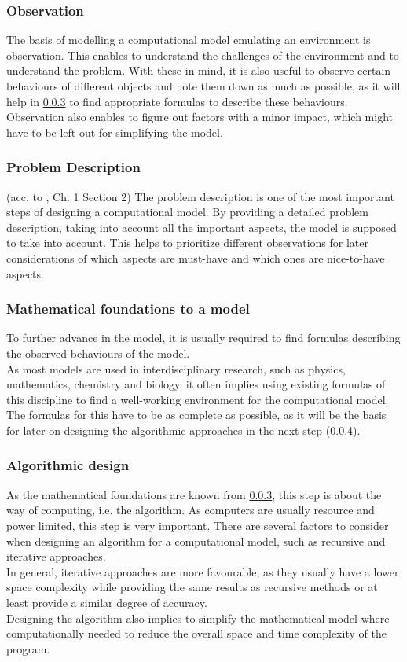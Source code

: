 \documentclass[conference,compsoc]{IEEEtran}
\begin{document}
\subsubsection{Observation}
The basis of modelling a computational model emulating an environment is observation. This enables to understand the challenges of the environment and to understand the problem. With these in mind, it is also useful to observe certain behaviours of different objects and note them down as much as possible, as it will help in \ref{Mathematical-foundations} to find appropriate formulas to describe these behaviours. \\
Observation also enables to figure out factors with a minor impact, which might have to be left out for simplifying the model.
\subsubsection{Problem Description}
(acc. to \cite{ComputationalModelsIntroduction}, Ch. 1 Section 2)
The problem description is one of the most important steps of designing a computational model. By providing a detailed problem description, taking into account all the important aspects, the model is supposed to take into account. This helps to prioritize different observations for later considerations of which aspects are must-have and which ones are nice-to-have aspects. 
\subsubsection{Mathematical foundations to a model}
\label{Mathematical-foundations}
To further advance in the model, it is usually required to find formulas describing the observed behaviours of the model. \\
As most models are used in interdisciplinary research, such as physics, mathematics, chemistry and biology, it often implies using existing formulas of this discipline to find a well-working environment for the computational model. 
The formulas for this have to be as complete as possible, as it will be the basis for later on designing the algorithmic approaches in the next step (\ref{algorithmic-design}).
\subsubsection{Algorithmic design}
\label{algorithmic-design}
As the mathematical foundations are known from \ref{Mathematical-foundations}, this step is about the way of computing, i.e. the algorithm. As computers are usually resource and power limited, this step is very important. There are several factors to consider when designing an algorithm for a computational model, such as recursive and iterative approaches. \\
In general, iterative approaches are more favourable, as they usually have a lower space complexity while providing the same results as recursive methods or at least provide a similar degree of accuracy. \\
Designing the algorithm also implies to simplify the mathematical model where computationally needed to reduce the overall space and time complexity of the program. 
\end{document}
